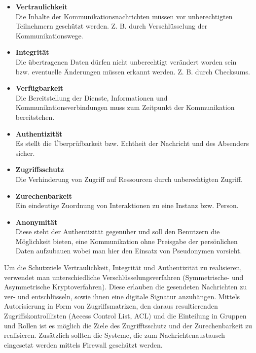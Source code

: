 \documentclass[a4paper]{scrartcl}
\begin{document}
	\begin{itemize}

		\item \textbf{Vertraulichkeit} \\
		Die Inhalte der Kommunikationsnachrichten müssen vor unberechtigten Teilnehmern geschützt werden.
        Z. B. durch Verschlüsselung der Kommunikationswege.

		\item \textbf{Integrität} \\
		Die übertragenen Daten dürfen nicht unberechtigt verändert worden sein bzw. eventuelle Änderungen müssen erkannt werden.
    	Z. B. durch Checksums.

		\item \textbf{Verfügbarkeit} \\
		Die Bereitstellung der Dienste, Informationen und Kommunikationsverbindungen muss zum Zeitpunkt der Kommunikation bereitstehen.

		\item \textbf{Authentizität} \\
		Es stellt die Überprüfbarkeit bzw. Echtheit der Nachricht und des Absenders sicher.

		\item \textbf{Zugriffsschutz} \\
		Die Verhinderung von Zugriff auf Ressourcen durch unberechtigten Zugriff.

		\item \textbf{Zurechenbarkeit} \\
		Ein eindeutige Zuordnung von Interaktionen zu eine Instanz bzw. Person.

		\item \textbf{Anonymität} \\
		Diese steht der Authentizität gegenüber und soll den Benutzern die Möglichkeit bieten, eine Kommunikation ohne Preisgabe der persönlichen Daten aufzubauen wobei man hier den Einsatz von Pseudonymen vorsieht.
	\end{itemize}
Um die Schutzziele Vertraulichkeit, Integrität und Authentizität zu realisieren, verwendet man  unterschiedliche Verschlüsselungsverfahren (Symmetrische- und Asymmetrische Kryptoverfahren). Diese erlauben die gesendeten Nachrichten zu ver- und entschlüsseln, sowie ihnen eine digitale Signatur anzuhängen. Mittels Autorisierung in Form von Zugriffsmatrizen, den daraus resultierenden Zugriffskontrolllisten (Access Control List, ACL) und die Einteilung in Gruppen und Rollen ist es möglich die Ziele des Zugrifftsschutz und der Zurechenbarkeit zu realisieren. Zusätzlich sollten die Systeme, die zum Nachrichtenaustausch eingesetzt werden mittels Firewall geschützt werden.
\end{document}
